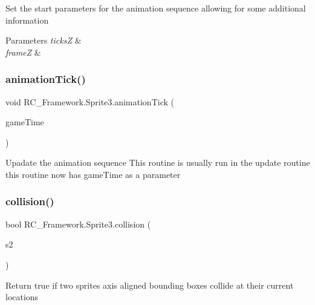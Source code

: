 Set the start parameters for the animation sequence allowing for some additional information 


\begin{DoxyParams}{Parameters}
{\em ticksZ} & \\
\hline
{\em frameZ} & \\
\hline
\end{DoxyParams}
\mbox{\label{class_r_c___framework_1_1_sprite3_aaba067bf7bc24cd0acd437a057a69eec}} 
\subsubsection{\texorpdfstring{animation\+Tick()}{animationTick()}}
{\footnotesize\ttfamily void R\+C\+\_\+\+Framework.\+Sprite3.\+animation\+Tick (\begin{DoxyParamCaption}\item[{Game\+Time}]{game\+Time }\end{DoxyParamCaption})}



Upadate the animation sequence This routine is usually run in the update routine this routine now has game\+Time as a parameter 

\mbox{\label{class_r_c___framework_1_1_sprite3_a91ecfec14fcf4e3d45968c46f17fd83b}} 
\subsubsection{\texorpdfstring{collision()}{collision()}}
{\footnotesize\ttfamily bool R\+C\+\_\+\+Framework.\+Sprite3.\+collision (\begin{DoxyParamCaption}\item[{\mbox{\hyperlink{class_r_c___framework_1_1_sprite3}{Sprite3}}}]{s2 }\end{DoxyParamCaption})}



Return true if two sprites axis aligned bounding boxes collide at their current locations 

